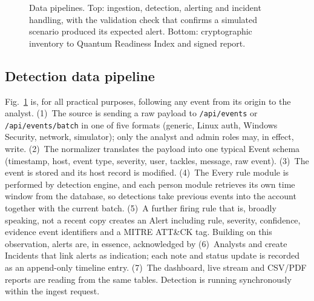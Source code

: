 \documentclass[conference]{IEEEtran}
\newcommand{\code}[1]{\texttt{#1}}
\begin{document}
\begin{figure}[t]
\caption{Data pipelines. Top: ingestion, detection, alerting and incident handling, with the validation check that confirms a simulated scenario produced its expected alert. Bottom: cryptographic inventory to Quantum Readiness Index and signed report.}
\label{fig:pipeline}
\end{figure}

\subsection{Detection data pipeline}
Fig.~\ref{fig:pipeline} is, for all practical purposes, following any event from its origin to the analyst. (1)~The source is sending a raw payload to \code{/api/events} or \code{/api/events/batch} in one of five formats (generic, Linux auth, Windows Security, network, simulator); only the analyst and admin roles may, in effect, write. (2)~The normalizer translates the payload into one typical Event schema (timestamp, host, event type, severity, user, tackles, message, raw event). (3)~The event is stored and its host record is modified. (4)~The Every rule module is performed by detection engine, and each person module retrieves its own time window from the database, so detections take previous events into the account together with the current batch. (5)~A further firing rule that is, broadly speaking, not a recent copy creates an Alert including rule, severity, confidence, evidence event identifiers and a MITRE ATT\&CK tag. Building on this observation, alerts are, in essence, acknowledged by (6)~Analysts and create Incidents that link alerts as indication; each note and status update is recorded as an append-only timeline entry. (7)~The dashboard, live stream and CSV/PDF reports are reading from the same tables. Detection is running synchronously within the ingest request.
\end{document}
